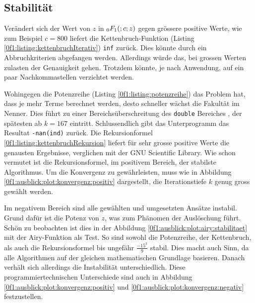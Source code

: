 \subsection{Stabilität
\label{0f1:subsection:Stabilitaet}}
Verändert sich der Wert von $z$ in $\mathstrut_0F_1(;c;z)$ gegen grössere positive Werte, wie zum Beispiel $c = 800$ liefert die Kettenbruch-Funktion (Listing \ref{0f1:listing:kettenbruchIterativ}) \verb+inf+ zurück. Dies könnte durch ein Abbruchkriterien abgefangen werden. Allerdings würde das, bei grossen Werten zulasten der Genauigkeit gehen. Trotzdem könnte, je nach Anwendung, auf ein paar Nachkommastellen verzichtet werden.

Wohingegen die Potenzreihe (Listing \ref{0f1:listing:potenzreihe}) das Problem hat, dass je mehr Terme berechnet werden, desto schneller wächst die Fakultät im Nenner. Dies führt zu einer Bereichsüberschreitung des \verb+double+ Bereiches \cite{0f1:double}, der spätesten ab $k=167$ eintritt. Schlussendlich gibt das Unterprogramm das Resultat \verb+-nan(ind)+ zurück.
Die Rekursionformel \eqref{0f1:listing:kettenbruchRekursion} liefert für sehr grosse positive Werte die genausten Ergebnisse, verglichen mit der GNU Scientific Library. Wie schon vermutet ist die Rekursionsformel, im positivem Bereich, der stabilste Algorithmus. Um die Konvergenz zu gewährleisten, muss wie in Abbildung \ref{0f1:ausblick:plot:konvergenz:positiv} dargestellt, die Iterationstiefe $k$ genug gross gewählt werden.

Im negativem Bereich sind alle gewählten und umgesetzten Ansätze instabil. Grund dafür ist die Potenz von $z$, was zum Phänomen der Auslöschung \cite{0f1:SeminarNumerik} führt. Schön zu beobachten ist dies in der Abbildung \ref{0f1:ausblick:plot:airy:stabilitaet} mit der Airy-Funktion als Test. So sind sowohl die Potenzreihe, der Kettenbruch, als auch die Rekursionsformel bis ungefähr $\frac{-15^3}{9}$ stabil. Dies macht auch Sinn, da alle Algorithmen auf der gleichen mathematischen Grundlage basieren. Danach verhält sich allerdings die Instabilität unterschiedlich. Diese programmiertechnischen Unterschiede sind auch in Abbildung \ref{0f1:ausblick:plot:konvergenz:positiv} und \ref{0f1:ausblick:plot:konvergenz:negativ} festzustellen.

